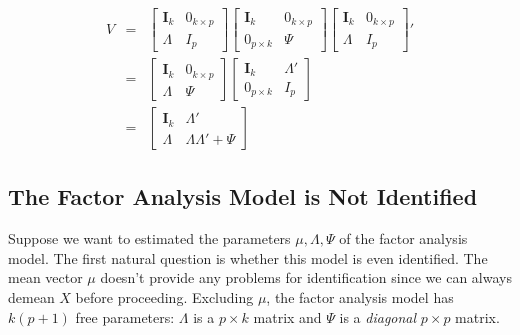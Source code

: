 \documentclass[12pt]{article}
\theoremstyle{definition}
\begin{document}
	\begin{eqnarray*}
		V &=& \left[\begin{array}{cc}
		\mathbf{I}_k & 0_{k\times p} \\ \Lambda & I_{p}
	\end{array}\right]
\left[\begin{array}{cc}
		\mathbf{I}_k & 0_{k\times p} \\ 0_{p\times k} & \Psi
	\end{array}\right]
	\left[\begin{array}{cc}
		\mathbf{I}_k & 0_{k\times p} \\ \Lambda & I_{p}
	\end{array}\right]'\\
	&=& \left[ \begin{array}
		{cc} 
		\mathbf{I}_k & 0_{k\times p}\\
		\Lambda & \Psi
	\end{array}\right]\left[\begin{array}{cc}
		\mathbf{I}_k & \Lambda '\\
		0_{p\times k} & I_{p} 
	\end{array}\right]\\
	&=& \left[\begin{array}
		{cc}
		\mathbf{I}_k & \Lambda' \\
		\Lambda & \Lambda \Lambda' + \Psi
	\end{array}\right]
	\end{eqnarray*}


\subsection{The Factor Analysis Model is Not Identified}
Suppose we want to estimated the parameters $\mu, \Lambda, \Psi$ of the factor analysis model. The first natural question is whether this model is even identified. The mean vector $\mu$ doesn't provide any problems for identification since we can always demean $X$ before proceeding. Excluding $\mu$, the factor analysis model has $k(p + 1)$ free parameters: $\Lambda$ is a $p\times k$ matrix and $\Psi$ is a \emph{diagonal} $p\times p$ matrix.
\end{document}
